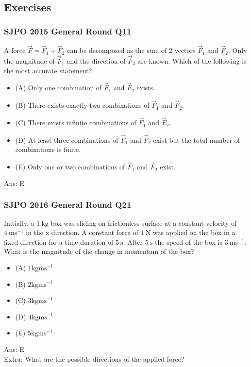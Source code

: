\documentclass{article}
\begin{document}
\subsection{Exercises}
\begin{samepage}
\subsubsection{SJPO 2015 General Round Q11}
A force $\vec{F} = \vec{F}_1 + \vec{F}_2$ can be decomposed as the sum of 2 vectors $\vec{F}_1$ and $\vec{F}_2$. Only the magnitude of $\vec{F}_1$ and the direction of $\vec{F}_2$ are known. Which of the following is the most accurate statement?
\begin{itemize}
\item[](A) Only one combination of $\vec{F}_1$ and $\vec{F}_2$ exists.
\item[](B) There exists exactly two combinations of $\vec{F}_1$ and $\vec{F}_2$.
\item[](C) There exists infinite combinations of $\vec{F}_1$ and $\vec{F}_2$.
\item[](D) At least three combinations of $\vec{F}_1$ and $\vec{F}_2$ exist but the total number of combinations is finite.
\item[](E) Only one or two combinations of $\vec{F}_1$ and $\vec{F}_2$ exist.
\end{itemize}
Ans: \ifpaper E \fi
\end{samepage}
\begin{samepage}
\subsubsection{SJPO 2016 General Round Q21}
Initially, a $1\mathrm{~kg}$ box was sliding on frictionless surface at a constant velocity of $4\mathrm{~ms}^{-1}$ in the $\mathrm{x}$ direction. A constant force of $1\mathrm{~N}$ was applied on the box in a fixed direction for a time duration of $5\mathrm{~s}$. After $5\mathrm{~s}$ the speed of the box is $3\mathrm{~ms}^{-1}$. What is the magnitude of the change in momentum of the box?
\begin{itemize}
\item[](A) $1 \mathrm{kgms}^{-1}$
\item[](B) $2 \mathrm{kgms}^{-1}$
\item[](C) $3 \mathrm{kgms}^{-1}$
\item[](D) $4 \mathrm{kgms}^{-1}$
\item[](E) $5 \mathrm{kgms}^{-1}$
\end{itemize}
Ans: \ifpaper E \fi \\[10pt]
Extra: What are the possible directions of the applied force? 
\end{samepage}
\newpage
\end{document}
